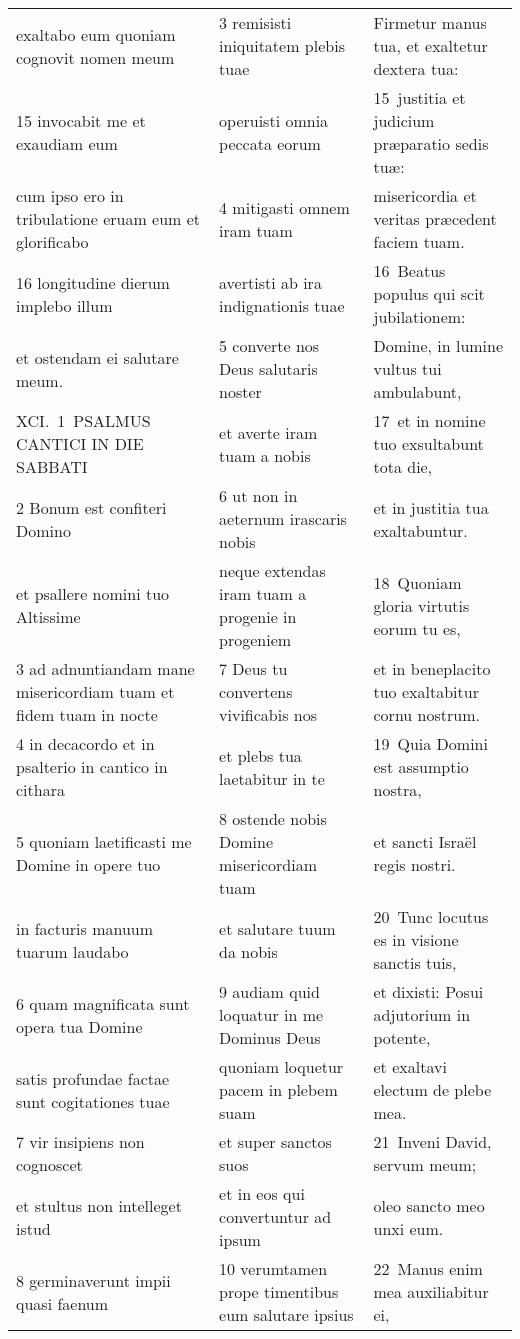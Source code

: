 \documentclass{article}
\begin{document}
\begin{longtable}{@{}p{}p{}p{}@{}}
exaltabo eum quoniam cognovit nomen meum	&	3 remisisti iniquitatem plebis tuae	&	Firmetur manus tua, et exaltetur dextera tua:	\\
15 invocabit me et exaudiam eum	&	operuisti omnia peccata eorum	&	15 justitia et judicium præparatio sedis tuæ:	\\
cum ipso ero in tribulatione eruam eum et glorificabo	&	4 mitigasti omnem iram tuam	&	misericordia et veritas præcedent faciem tuam.	\\
16 longitudine dierum implebo illum	&	avertisti ab ira indignationis tuae	&	16 Beatus populus qui scit jubilationem:	\\
et ostendam ei salutare meum.	&	5 converte nos Deus salutaris noster	&	Domine, in lumine vultus tui ambulabunt,	\\
XCI. 1 PSALMUS CANTICI IN DIE SABBATI	&	et averte iram tuam a nobis	&	17 et in nomine tuo exsultabunt tota die,	\\
2 Bonum est confiteri Domino	&	6 ut non in aeternum irascaris nobis	&	et in justitia tua exaltabuntur.	\\
et psallere nomini tuo Altissime	&	neque extendas iram tuam a progenie in progeniem	&	18 Quoniam gloria virtutis eorum tu es,	\\
3 ad adnuntiandam mane misericordiam tuam et fidem tuam in nocte	&	7 Deus tu convertens vivificabis nos	&	et in beneplacito tuo exaltabitur cornu nostrum.	\\
4 in decacordo et in psalterio in cantico in cithara	&	et plebs tua laetabitur in te	&	19 Quia Domini est assumptio nostra,	\\
5 quoniam laetificasti me Domine in opere tuo	&	8 ostende nobis Domine misericordiam tuam	&	et sancti Israël regis nostri.	\\
in facturis manuum tuarum laudabo	&	et salutare tuum da nobis	&	20 Tunc locutus es in visione sanctis tuis,	\\
6 quam magnificata sunt opera tua Domine	&	9 audiam quid loquatur in me Dominus Deus	&	et dixisti: Posui adjutorium in potente,	\\
satis profundae factae sunt cogitationes tuae	&	quoniam loquetur pacem in plebem suam	&	et exaltavi electum de plebe mea.	\\
7 vir insipiens non cognoscet	&	et super sanctos suos	&	21 Inveni David, servum meum;	\\
et stultus non intelleget istud	&	et in eos qui convertuntur ad ipsum	&	oleo sancto meo unxi eum.	\\
8 germinaverunt impii quasi faenum	&	10 verumtamen prope timentibus eum salutare ipsius	&	22 Manus enim mea auxiliabitur ei,	\\

\end{longtable}
\end{document}
